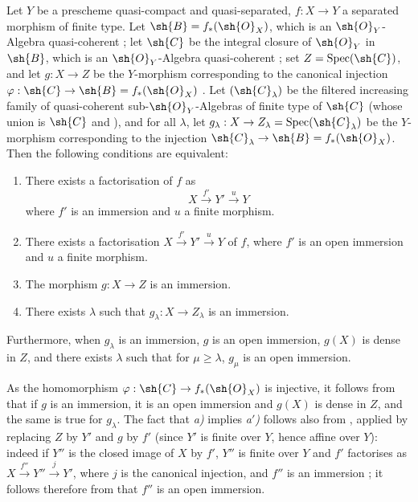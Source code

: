\begin{proposition}[8.12.3]
\label{IV.8.12.3}
Let $Y$ be a prescheme quasi-compact and quasi-separated, $f:X\to Y$ a separated morphism of finite type.
Let $\sh{B}=f_*(\sh{O}_X)$, which is an $\sh{O}_Y$-Algebra quasi-coherent ; let $\sh{C}$ be the integral closure of $\sh{O}_Y$ in $\sh{B}$, which is an $\sh{O}_Y$-Algebra quasi-coherent ; set $Z=\operatorname{Spec}(\sh{C})$, and let $g:X\to Z$ be the $Y$-morphism corresponding to the canonical injection $\varphi:\sh{C}\to\sh{B}=f_*(\sh{O}_X)$ . Let $(\sh{C}_\lambda)$ be the filtered increasing family of quasi-coherent sub-$\sh{O}_Y$-Algebras of finite type of $\sh{C}$ (whose union is $\sh{C}$  and ), and for all $\lambda$, let $g_\lambda:X\to Z_\lambda=\operatorname{Spec}(\sh{C}_\lambda)$ be the $Y$-morphism corresponding to the injection $\sh{C}_\lambda\to\sh{B}=f_*(\sh{O}_X)$.
Then the following conditions are equivalent:
\begin{enumerate}[label=\emph{\alph*)}]
  \item[\emph{a)}] There exists a factorisation of $f$ as
\[
X\xrightarrow{f'}Y'\xrightarrow{u}Y
\]
where $f'$ is an immersion and $u$ a finite morphism.
  \item[\emph{a$'$)}] There exists a factorisation $X\xrightarrow{f'}Y'\xrightarrow{u}Y$ of $f$, where $f'$ is an open immersion and $u$ a finite morphism.
  \item[\emph{b)}] The morphism $g:X\to Z$ is an immersion.
  \item[\emph{c)}] There exists $\lambda$ such that $g_\lambda:X\to Z_\lambda$ is an immersion.
\end{enumerate}
Furthermore, when $g_\lambda$ is an immersion, $g$ is an open immersion, $g(X)$ is dense in $Z$, and there exists $\lambda$ such that for $\mu\geqslant\lambda$, $g_\mu$ is an open immersion.
\end{proposition}

As the homomorphism $\varphi:\sh{C}\to f_*(\sh{O}_X)$ is injective, it follows from  that if $g$ is an immersion, it is an open immersion and $g(X)$ is dense in $Z$, and the same is true for $g_\lambda$.
The fact that \emph{a)} implies \emph{a$'$)} follows also from , applied by replacing $Z$ by $Y'$ and $g$ by $f'$ (since $Y'$ is finite over $Y$, hence affine over $Y$): indeed if $Y''$ is the closed image of $X$ by $f'$, $Y''$ is finite over $Y$ and $f'$ factorises as $X\xrightarrow{f''}Y''\xrightarrow{j}Y'$, where $j$ is the canonical injection, and $f''$ is an immersion ; it follows therefore from  that $f''$ is an open immersion.

